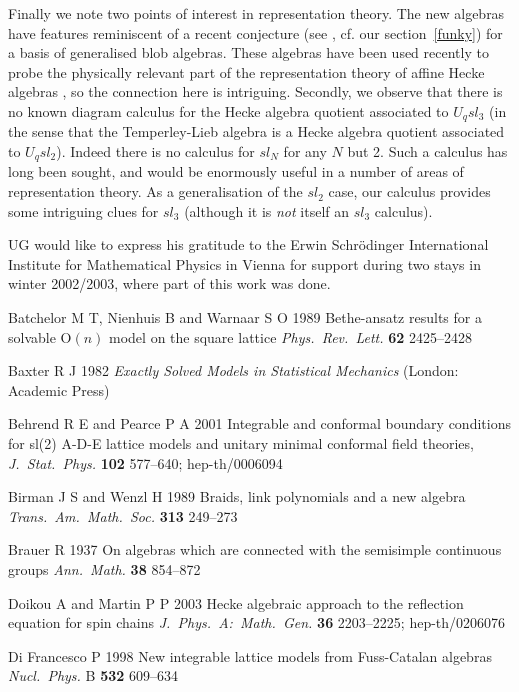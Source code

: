 \documentclass[12pt]{iopart}
\begin{document}
Finally we note two points of interest in representation theory.  The
new algebras have features reminiscent of a recent conjecture (see
\cite{MW02}, cf. our section~\ref{funky}) for a basis of generalised
blob algebras.  These algebras have been used recently to probe the
physically relevant part of the representation theory of affine Hecke
algebras \cite{DM02}, so the connection here is intriguing.  Secondly,
we observe that there is no known diagram calculus for the Hecke
algebra quotient associated to $U_qsl_3 $ (in the sense that the
Temperley-Lieb algebra is a Hecke algebra quotient associated to
$U_qsl_2$).  Indeed there is no calculus for $sl_N$ for any $N$ but 2.
Such a calculus has long been sought, and would be enormously useful
in a number of areas of representation theory.  As a generalisation of
the $sl_2$ case, our calculus provides some intriguing clues for
$sl_3$ (although it is {\em not}\/ itself an $sl_3$ calculus).

\ack 

UG would like to express his gratitude to the Erwin Schr\"{o}dinger
International Institute for Mathematical Physics in Vienna for support
during two stays in winter 2002/2003, where part of this work was
done.


Batchelor M T, Nienhuis B and Warnaar S O 1989
Bethe-ansatz results for a solvable $\mbox{O}(n)$ model on the square
lattice 
{\it Phys.\ Rev.\ Lett.}\/ {\bf 62} 2425--2428

Baxter R J 1982
{\it Exactly Solved Models in Statistical Mechanics}\/
(London: Academic Press)

Behrend R E and Pearce P A 2001
Integrable and conformal boundary conditions for sl(2) 
A-D-E lattice models 
and unitary minimal conformal field theories,
{\it J.\ Stat.\ Phys.}\/ {\bf 102} 577--640;
hep-th/0006094

Birman J S and Wenzl H 1989
Braids, link polynomials and a new algebra
{\it Trans.\ Am.\ Math.\ Soc.}\/ {\bf 313} 249--273

Brauer R 1937
On algebras which are connected with the 
semisimple continuous groups
{\it Ann.\ Math.}\/ {\bf 38} 854--872

Doikou A and Martin P P 2003
Hecke algebraic approach to the reflection equation for spin chains
{\it J.\ Phys.\ A:\  Math.\ Gen.}\/ {\bf 36} 2203--2225;
hep-th/0206076

Di Francesco P 1998
New integrable lattice models from Fuss-Catalan algebras
{\it Nucl.\ Phys.}\/ B {\bf 532} 609--634
\end{document}
